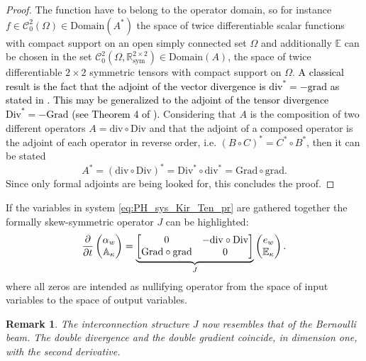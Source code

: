 \documentclass[11pt]{article}
\newtheorem{remark}{Remark}
\newcommand{\revOne}[1]{\textcolor{black}{#1}}
\begin{document}
\begin{proof}
		
		The function have to belong to the operator domain, so for instance $f \in \mathcal{C}_0^2(\Omega) \in \mathrm{Domain}(A^*)$ the space of twice differentiable scalar functions with compact support on an open simply connected set $\Omega$ and additionally $\mathbb{E}$ can be chosen in the set $\mathcal{C}_{0}^2(\Omega, \mathbb{R}^{2 \times 2}_{\text{sym}}) \in \mathrm{Domain}(A)$, the space of twice differentiable $2 \times 2$ symmetric tensors with compact support on $\Omega$. \revOne{ A classical result is the fact that the adjoint of the vector divergence is $\mathrm{div}^* = -\mathrm{grad}$ as stated in \cite{kurula2012duality}. This may be generalized to the adjoint of the tensor divergence $\mathrm{Div}^* = -\mathrm{Grad}$ (see Theorem 4 of \cite{BrugnoliMin}).} Considering that $A$ is the composition of two different operators $A = \mathrm{div} \circ \mathrm{Div}$ and that the adjoint of a composed operator is the adjoint of each operator in reverse order, i.e. $(B \circ C)^* = C^* \circ B^*$, then it can be stated
		\[
		A^* = (\mathrm{div} \circ \mathrm{Div})^* = \mathrm{Div}^* \circ \mathrm{div}^* = \mathrm{Grad} \circ \mathrm{grad}.
		\]  
		Since only formal adjoints are being looked for, this concludes the proof.
	\end{proof}
	If the variables in system \eqref{eq:PH_sys_Kir_Ten_pr} are gathered together the formally skew-symmetric operator $J$ can be highlighted:
	\begin{equation}
	\label{eq:PH_sys_Kir_Ten}
	\diffp{}{t}
	\begin{pmatrix}
	\alpha_w \\
	\mathbb{A}_{\kappa} \\
	\end{pmatrix} = 
	\underbrace{\begin{bmatrix}
		0  &  - \mathrm{div} \circ \mathrm{Div} \\
		\mathrm{Grad} \circ \mathrm{grad} & 0 \\
		\end{bmatrix}}_{J}
	\begin{pmatrix}
	e_w \\
	\mathbb{E}_{\kappa} \\
	\end{pmatrix}.
	\end{equation}
	where all zeros are intended as nullifying operator from the space of input variables to the space of output variables.
	\begin{remark}
		The interconnection structure $J$ now resembles that of the Bernoulli beam. The double divergence and the double gradient coincide, in dimension one, with the second derivative.
	\end{remark}
\end{document}
